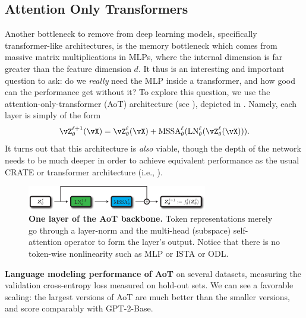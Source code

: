 \documentclass[../../book-main.tex]{subfiles}
\begin{document}
\subsection{Attention Only Transformers} \label{sub:aot_experiments}

Another bottleneck to remove from deep learning models, specifically transformer-like architectures, is the memory bottleneck which comes from massive matrix multiplications in MLPs, where the internal dimension is far greater than the feature dimension \(d\). It thus is an interesting and important question to ask: do we \textit{really} need the MLP inside a transformer, and how good can the performance get without it? To explore this question, we use the attention-only-transformer (AoT) architecture (see ), depicted in . Namely, each layer is simply of the form 
\begin{equation}
    \vZ_{\theta}^{\ell + 1}(\vX) = \vZ_{\theta}^{\ell}(\vX) + \MSSA_{\theta}^{\ell}(\LN_{\theta}^{\ell}(\vZ_{\theta}^{\ell}(\vX))).
\end{equation}
It turns out that this architecture is \textit{also} viable, though the depth of the network needs to be much deeper in order to achieve equivalent performance as the usual CRATE or transformer architecture (i.e., ).


\begin{figure}
    \centering 
    \includegraphics[width=0.7\textwidth]{chapters/chapter7/figs/aot_backbone.pdf}
    \caption{\small\textbf{One layer of the AoT backbone.} Token representations merely go through a layer-norm and the multi-head (subspace) self-attention operator to form the layer's output. Notice that there is no token-wise nonlinearity such as MLP or ISTA or ODL.}
    \label{fig:aot_backbone}
\end{figure}

\begin{table}
    \centering 
    \caption{\small\textbf{Language modeling performance of AoT} on several datasets, measuring the validation cross-entropy loss measured on hold-out sets. We can see a favorable scaling: the largest versions of AoT are much better than the smaller versions, and score comparably with GPT-2-Base.}
    \label{tab:aot_lm}
\end{table}
\end{document}
